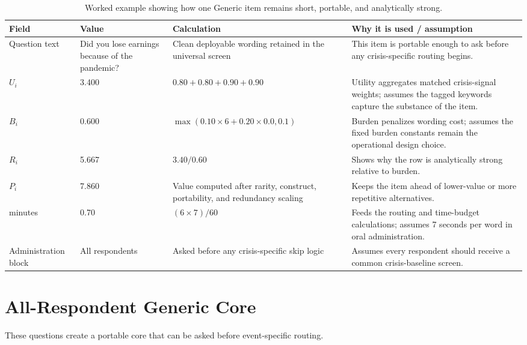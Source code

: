 \documentclass[12pt]{article}
\begin{document}
\begin{table}[H]
\centering
\begin{tabularx}{\textwidth}{L{0.18\textwidth} R{0.12\textwidth} Y Y}
\toprule
Field & Value & Calculation & Why it is used / assumption \\
\midrule
Question text & Did you lose earnings because of the pandemic? & Clean deployable wording retained in the universal screen & This item is portable enough to ask before any crisis-specific routing begins. \\
$U_i$ & 3.400 & $0.80 + 0.80 + 0.90 + 0.90$ & Utility aggregates matched crisis-signal weights; assumes the tagged keywords capture the substance of the item. \\
$B_i$ & 0.600 & $\max(0.10 \times 6 + 0.20 \times 0.0, 0.1)$ & Burden penalizes wording cost; assumes the fixed burden constants remain the operational design choice. \\
$R_i$ & 5.667 & $3.40 / 0.60$ & Shows why the row is analytically strong relative to burden. \\
$P_i$ & 7.860 & Value computed after rarity, construct, portability, and redundancy scaling & Keeps the item ahead of lower-value or more repetitive alternatives. \\
minutes & 0.70 & $(6 \times 7) / 60$ & Feeds the routing and time-budget calculations; assumes 7 seconds per word in oral administration. \\
Administration block & All respondents & Asked before any crisis-specific skip logic & Assumes every respondent should receive a common crisis-baseline screen. \\
\bottomrule
\end{tabularx}
\caption{Worked example showing how one Generic item remains short, portable, and analytically strong.}
\end{table}

\section{All-Respondent Generic Core}

These questions create a portable core that can be asked before event-specific routing.
\end{document}
